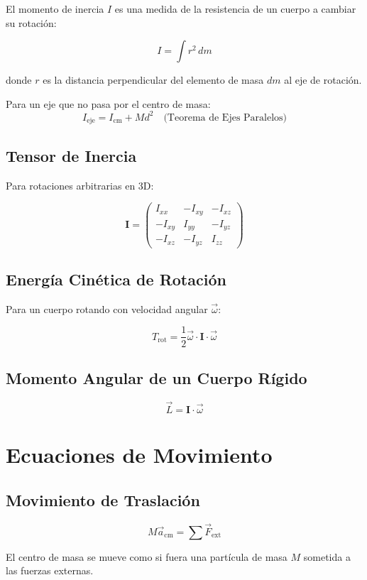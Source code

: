 El momento de inercia $I$ es una medida de la resistencia de un cuerpo a cambiar su rotación:

$$I = \int r^2 \, dm$$

donde $r$ es la distancia perpendicular del elemento de masa $dm$ al eje de rotación.

Para un eje que no pasa por el centro de masa:
$$I_{\text{eje}} = I_{\text{cm}} + Md^2 \quad \text{(Teorema de Ejes Paralelos)}$$

\subsection*{Tensor de Inercia}

Para rotaciones arbitrarias en 3D:

$$\mathbf{I} = \begin{pmatrix} I_{xx} & -I_{xy} & -I_{xz} \\ -I_{xy} & I_{yy} & -I_{yz} \\ -I_{xz} & -I_{yz} & I_{zz} \end{pmatrix}$$

\subsection*{Energía Cinética de Rotación}

Para un cuerpo rotando con velocidad angular $\vec{\omega}$:

$$T_{\text{rot}} = \frac{1}{2}\vec{\omega} \cdot \mathbf{I} \cdot \vec{\omega}$$

\subsection*{Momento Angular de un Cuerpo Rígido}

$$\vec{L} = \mathbf{I} \cdot \vec{\omega}$$

\section{Ecuaciones de Movimiento}

\subsection*{Movimiento de Traslación}

$$M\vec{a}_{\text{cm}} = \sum \vec{F}_{\text{ext}}$$

El centro de masa se mueve como si fuera una partícula de masa $M$ sometida a las fuerzas externas.

